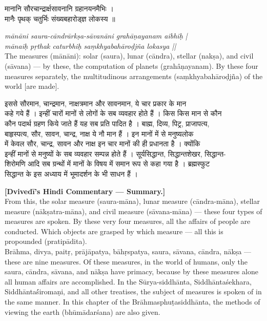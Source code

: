 \documentclass[11pt,a4paper]{article}
\newcommand{\dev}[1]{{\devanagarifont #1}}
\newcommand{\bilingualpair}[2]{%
  \noindent%
  \begin{minipage}[t]{0.48\textwidth}
    #1%
  \end{minipage}%
  \hfill%
  \begin{minipage}[t]{0.48\textwidth}
    #2%
  \end{minipage}%
  \par\vspace{0.5em}%
}
\newenvironment{sanskritcol}{\devanagarifont\small}{}
\newenvironment{englishcol}{\iastfont\small}{}
\begin{document}
\vspace{0.3cm}
\bilingualpair{%
\begin{sanskritcol}
\dev{मानानि सौरचान्द्रार्क्षसावनानि ग्रहानयनमैभिः ।}\\[0.3em]
\dev{मानैः पृथक् चतुर्भिः संख्यबहारोड्ज्ञ लोकस्य ॥}
\end{sanskritcol}%
}{%
\begin{englishcol}
\textit{mānāni saura-cāndrārkṣa-sāvanāni grahāṇayanam aibhiḥ |}\\[0.3em]
\textit{mānaiḥ pṛthak caturbhiḥ saṃkhyabahāroḍjña lokasya ||}\\[0.3em]
The measures (mānāni): solar (saura), lunar (cāndra), stellar (nakṣa), and civil (sāvana) --- by these, the computation of planets (grahâṇayanam). By these four measures separately, the multitudinous arrangements (saṃkhyabahāroḍjña) of the world [are made].
\end{englishcol}%
}

\vspace{0.3cm}
\bilingualpair{%
\begin{sanskritcol}
\dev{इससे सौरमान, चान्द्रमान, नाक्षत्रमान और सावनमान, ये चार प्रकार के मान}\\[0.3em]
\dev{कहे गये हैं । इन्हीं चारों मानों से लोगों के सब व्यवहार होते हैं । किस किस मान से कौन}\\[0.3em]
\dev{कौन पदार्थ ग्रहण किये जाते हैं यह सब प्रति पादित है । बाह्म, दिव्य, पिट्र, प्राजापत्य,}\\[0.3em]
\dev{बाहृस्पत्य, सौर, सावन, चान्द्र, नाक्ष ये नौ मान हैं । इन मानों में से मनुष्यलोक}\\[0.3em]
\dev{में केवल सौर, चान्द्र, सावन और नाक्ष इन चार मानों की ही प्रधानता है । क्योंकि}\\[0.3em]
\dev{इन्हीं मानों से मनुष्यों के सब व्यवहार सम्पन्न होते हैं । सूर्यसिद्धान्त, सिद्धान्तशेखर, सिद्धान्त-}\\[0.3em]
\dev{शिरोमणि आदि सब ग्रन्थों में मानों के विषय में समान रूप से कहा गया है । ब्रह्मस्फुट}\\[0.3em]
\dev{सिद्धान्त के इस अध्याय में भूमादर्शन के भी साधन हैं ।}
\end{sanskritcol}%
}{%
\begin{englishcol}
\textbf{[Dvivedī's Hindi Commentary --- Summary.]}\\[0.3em]
From this, the solar measure (saura-māna), lunar measure (cāndra-māna), stellar measure (nākṣatra-māna), and civil measure (sāvana-māna) --- these four types of measures are spoken. By these very four measures, all the affairs of people are conducted. Which objects are grasped by which measure --- all this is propounded (pratipādita).\\[0.3em]
Brāhma, divya, paitṛ, prājāpatya, bāhṛspatya, saura, sāvana, cāndra, nākṣa --- these are nine measures. Of these measures, in the world of humans, only the saura, cāndra, sāvana, and nākṣa have primacy, because by these measures alone all human affairs are accomplished. In the Sūrya-siddhānta, Siddhānta\'sek\-{}hara, Siddhānta\'śiro\-{}maṇi, and all other treatises, the subject of measures is spoken of in the same manner. In this chapter of the Brāhmasphuṭasiddhānta, the methods of viewing the earth (bhūmādarśana) are also given.
\end{englishcol}%
}
\end{document}
